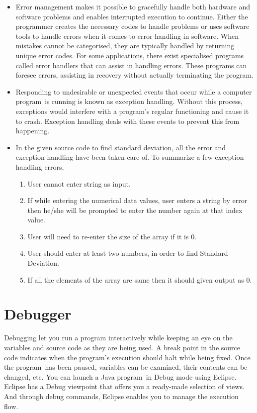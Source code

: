 \documentclass[12pt,a4paper]{report}
\begin{document}
\begin{itemize}
    \item Error management makes it possible to gracefully handle both hardware and software problems and enables interrupted execution to continue. Either the programmer creates the necessary codes to handle problems or uses software tools to handle errors when it comes to error handling in software. When mistakes cannot be categorised, they are typically handled by returning unique error codes. For some applications, there exist specialised programs called error handlers that can assist in handling errors. These programs can foresee errors, assisting in recovery without actually terminating the program. 
    \item Responding to undesirable or unexpected events that occur while a computer program is running is known as exception handling. Without this process, exceptions would interfere with a program's regular functioning and cause it to crash. Exception handling deals with these events to prevent this from happening.
    \item In the given source code to find standard deviation, all the error and exception handling have been taken care of. To summarize a few exception handling errors, 
    \begin{enumerate}
        \item User cannot enter string as input. 
        \item If while entering the numerical data values, user enters a string by error then he/she will be prompted to enter the number again at that index value.
        \item User will need to re-enter the size of the array if it is 0.
        \item User should enter at-least two numbers, in order to find Standard Deviation.
        \item If all the elements of the array are same then it should given output as 0.
    \end{enumerate}
\end{itemize}

\newpage
\section{Debugger}
Debugging let you run a program interactively while keeping an eye on the variables and source code as they are being used. A break point in the source code indicates when the program's execution should halt while being fixed. Once the program has been paused, variables can be examined, their contents can be changed, etc. You can launch a Java program in Debug mode using Eclipse. Eclipse has a Debug viewpoint that offers you a ready-made selection of views. And through debug commands, Eclipse enables you to manage the execution flow.
\end{document}
